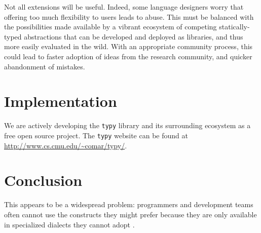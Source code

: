 \documentclass{sigplanconf}
\newcommand{\lip}[1]{\lstinline[language=Python,basicstyle=\ttfamily\small,deletendkeywords={tuple,buffer,map}]{#1}}
\begin{document}
%
% 
%
%

Not all extensions will be useful. Indeed, some language designers worry that offering too much flexibility to users leads to abuse. This must be balanced with the possibilities made available by a vibrant ecosystem of competing statically-typed abstractions that can be developed and deployed as libraries, and thus more easily evaluated in the wild. With an appropriate community process, this could lead to faster adoption of ideas from the research community, and quicker abandonment of mistakes. %
% 


\section{Implementation}
We are actively developing the \verb|typy| library and its surrounding ecosystem as a free open source project. The \lip{typy} website can be found at \url{http://www.cs.cmu.edu/~comar/typy/}.

\section{Conclusion}This appears to be a widespread problem: programmers and development teams often cannot use  the constructs they might prefer because they are only available in specialized dialects they cannot  adopt \cite{Meyerovich:2012:SDR:2414721.2414724,Meyerovich:2013:EAP:2509136.2509515}. %
\end{document}
